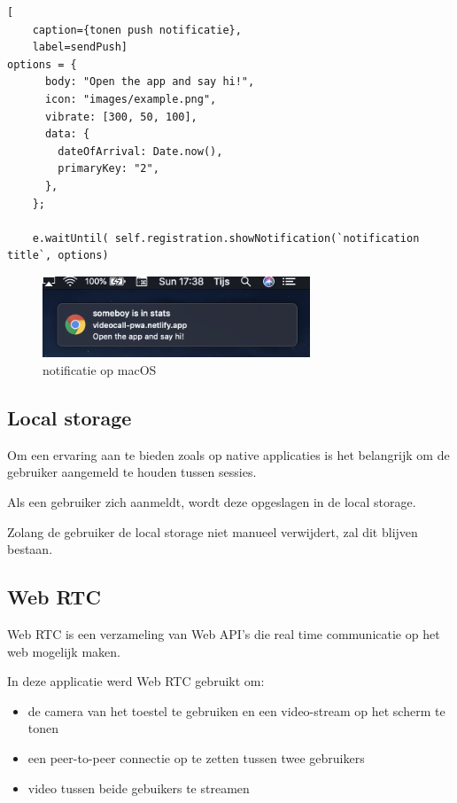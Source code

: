 \newpage
\begin{lstlisting}[
	caption={tonen push notificatie},
	label=sendPush]
options = {
      body: "Open the app and say hi!",
      icon: "images/example.png",
      vibrate: [300, 50, 100],
      data: {
        dateOfArrival: Date.now(),
        primaryKey: "2",
      },
    };

    e.waitUntil( self.registration.showNotification(`notification title`, options)
\end{lstlisting}

	\begin{figure}[H]
		\centering
		\includegraphics[width=80mm]{./img/notificationMacOs}{}		
		\caption{notificatie op macOS}
		\label{fig:notificationMacOS}
	\end{figure}
			
	\subsection{Local storage}
		
		Om een ervaring aan te bieden zoals op native applicaties is het belangrijk om de gebruiker aangemeld te houden tussen sessies.
		
		Als een gebruiker zich aanmeldt, wordt deze opgeslagen in de local storage.
		
		Zolang de gebruiker de local storage niet manueel verwijdert, zal dit blijven bestaan. 
		\autocite{Mozilla2020d}
		
	\subsection{Web RTC}
		
		Web RTC is een verzameling van Web API's die real time communicatie  op het web mogelijk maken. 
		
		In deze applicatie werd Web RTC gebruikt om:
		\begin{itemize}
			\item de camera van het toestel te gebruiken en een video-stream op het scherm te tonen
			\item een peer-to-peer connectie op te zetten tussen twee gebruikers
			\item video tussen beide gebuikers te streamen
		\end{itemize} 
		\autocite{webRTC2020}
		
